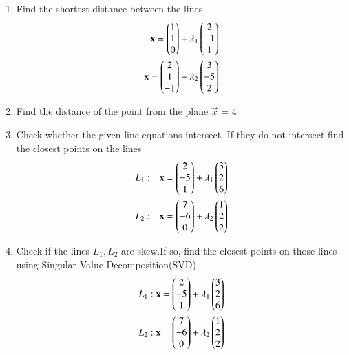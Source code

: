 \renewcommand{\theequation}{\theenumi}
\begin{enumerate}[label=\thesubsection.\arabic*.,ref=\thesubsection.\theenumi]

  
\item Find the shortest distance between the lines
\begin{align}
\mathbf{x}=\begin{pmatrix}1\\1\\0\end{pmatrix}+\lambda_1\begin{pmatrix}2\\-1\\1\end{pmatrix}\\
\mathbf{x}=\begin{pmatrix}2\\1\\-1\end{pmatrix}+\lambda_2\begin{pmatrix}3\\-5\\2\end{pmatrix}
\end{align}
\solution

\item Find the distance of the point  from the plane $\vec{x}$ = 4
\\
\solution

%
\item  Check whether the given line equations intersect. If they do not  intersect find the closest points on the lines 
\begin{align}
L_1 & : & \mathbf{x}=\begin{pmatrix}2\\-5\\1\end{pmatrix}+\lambda_1\begin{pmatrix}3\\2\\6\end{pmatrix}\\
L_2 & : & \mathbf{x}=\begin{pmatrix}7\\-6\\0\end{pmatrix}+\lambda_2\begin{pmatrix}1\\2\\2\end{pmatrix}\end{align}
\solution

\item Check if the lines $L_1,L_2$ are skew.If so, find the closest points on those lines using Singular Value Decomposition(SVD)
\begin{align}
L_1: \mathbf{x}=\begin{pmatrix}2\\-5\\1\end{pmatrix}+\lambda_1\begin{pmatrix}3\\2\\6\end{pmatrix}\\
L_2: \mathbf{x}=\begin{pmatrix}7\\-6\\0\end{pmatrix}+\lambda_2\begin{pmatrix}1\\2\\2\end{pmatrix}
\end{align}


\end{enumerate}
